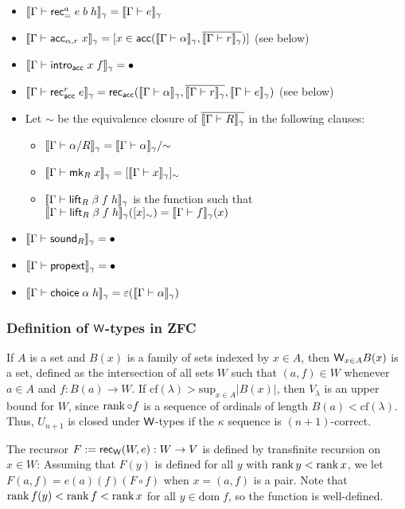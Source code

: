\begin{itemize}
\item $\scott{\Gamma\vdash\rec_=^a\;e\;b\;h}_\gamma=\scott{\Gamma\vdash e}_\gamma$
\item $\scott{\Gamma\vdash\acc_{\alpha,r}\;x}_\gamma=[x\in\acc(\scott{\Gamma\vdash \alpha}_\gamma,\overline{\scott{\Gamma\vdash r}_\gamma})]$ (see below)
\item $\scott{\Gamma\vdash\intro_\acc\;x\;f}_\gamma=\bullet$
\item $\scott{\Gamma\vdash\rec_\acc^r\;e}_\gamma=\rec_\acc(\scott{\Gamma\vdash\alpha}_\gamma,\overline{\scott{\Gamma\vdash r}_\gamma},\scott{\Gamma\vdash e}_\gamma)$ (see below)
\item Let $\sim$ be the equivalence closure of $\overline{\scott{\Gamma\vdash R}_\gamma}$ in the following clauses:
\begin{itemize}
\item $\scott{\Gamma\vdash\alpha/R}_\gamma=\scott{\Gamma\vdash\alpha}_\gamma/{\sim}$
\item $\scott{\Gamma\vdash\mk_R\;x}_\gamma=[\scott{\Gamma\vdash x}_\gamma]_\sim$
\item $\scott{\Gamma\vdash\lift_R\;\beta\;f\;h}_\gamma$ is the function such that $\scott{\Gamma\vdash\lift_R\;\beta\;f\;h}_\gamma([x]_\sim)=\scott{\Gamma\vdash f}_\gamma(x)$
\end{itemize}
\item $\scott{\Gamma\vdash\sound_R}_\gamma=\bullet$
\item $\scott{\Gamma\vdash\mathsf{propext}}_\gamma=\bullet$
\item $\scott{\Gamma\vdash\mathsf{choice}\;\alpha\;h}_\gamma=\vep(\scott{\Gamma\vdash\alpha}_\gamma)$
\end{itemize}

\subsubsection{Definition of $\mathsf{W}$-types in ZFC}
If $A$ is a set and $B(x)$ is a family of sets indexed by $x\in A$, then $\mathsf{W}_{x\in A}B(x)$ is a set, defined as the intersection of all sets $W$ such that $(a,f)\in W$ whenever $a\in A$ and $f:B(a)\to W$. If $\mathrm{cf}(\lambda)>\mathrm{sup}_{x\in A}|B(x)|$, then $V_\lambda$ is an upper bound for $W$, since $\operatorname{rank}\circ f$ is a sequence of ordinals of length $B(a)<\mathrm{cf}(\lambda)$. Thus, $U_{n+1}$ is closed under $\mathsf{W}$-types if the $\kappa$ sequence is $(n+1)$-correct.

The recursor $F:=\mathsf{rec}_{\mathsf{W}}(W,e):W\to V$ is defined by transfinite recursion on $x\in W$: Assuming that $F(y)$ is defined for all $y$ with $\operatorname{rank} y<\operatorname{rank} x$, we let $F(a,f)=e(a)(f)(F\circ f)$ when $x=(a,f)$ is a pair. Note that $\operatorname{rank} f(y)<\operatorname{rank} f<\operatorname{rank} x$ for all $y\in\mathrm{dom}\;f$, so the function is well-defined.

